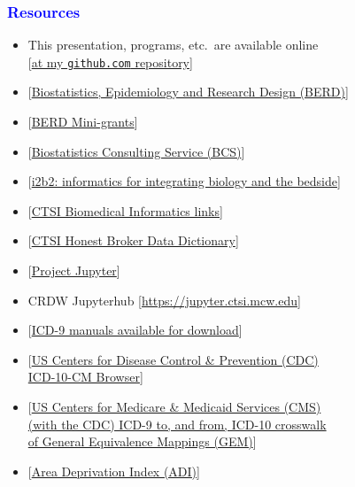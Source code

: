 \documentclass[11pt,pdftex,dvipsnames,usenames]{beamer}
\begin{document}
\begin{frame}[fragile]\frametitle{\bf\textcolor{blue}{Resources}}

\begin{itemize}
\item This presentation, programs, etc.\ are available online\\
\textcolor{PineGreen}{[\href{https://github.com/rsparapa/CTSI/tree/main/Summer22}{at my \texttt{github.com} repository}]}
\item \textcolor{PineGreen}{[\href{https://ctsi.mcw.edu/about/history/support/berd}
{Biostatistics, Epidemiology and Research Design (BERD)}]}
\item \textcolor{PineGreen}{[\href{https://ctsi.mcw.edu/investigator/services/ctsi-mini-grants/biostatistical-consultation}
{BERD Mini-grants}]}
\item \textcolor{PineGreen}{[\href{https://www.mcw.edu/departments/biostatistics/biostatistics-consulting-service}{Biostatistics Consulting Service (BCS)}]}
\item \textcolor{PineGreen}{[\href{https://www.i2b2.org}
{i2b2: informatics for integrating biology and the bedside}]}
\item \textcolor{PineGreen}{[\href{https://ctri.mcw.edu/resources/bmi-links}
{CTSI Biomedical Informatics links}]}
\item \textcolor{PineGreen}{[\href{https://ctri.mcw.edu/wp-content/uploads/CTSI-Honest-Broker-Data-Dictionary.pdf}{CTSI Honest Broker Data Dictionary}]}
\item \textcolor{PineGreen}{[\href{https://en.wikipedia.org/wiki/Project_Jupyter}{Project Jupyter}]}
\item CRDW Jupyterhub \textcolor{PineGreen}{[\href{https://jupyter.ctsi.mcw.edu}{https://jupyter.ctsi.mcw.edu}]}
\item \textcolor{PineGreen}{[\href{https://www.cdc.gov/nchs/icd/icd9cm.htm}
{ICD-9 manuals available for download}]}
\item \textcolor{PineGreen}{[\href{https://icd10cmtool.cdc.gov}
{US Centers for Disease Control \& Prevention (CDC)\\ 
ICD-10-CM Browser}]}
\item \textcolor{PineGreen}{[\href{https://www.nber.org/research/data/icd-9-cm-and-icd-10-cm-and-icd-10-pcs-crosswalk-or-general-equivalence-mappings}
{US Centers for Medicare \& Medicaid Services (CMS) \\
(with the CDC) ICD-9 to, and from, ICD-10 crosswalk \\
of General Equivalence Mappings (GEM)}]}
\item \textcolor{PineGreen}{[\href{https://www.neighborhoodatlas.medicine.wisc.edu}{Area Deprivation Index (ADI)}]}
\end{itemize}

\end{frame}
\end{document}
